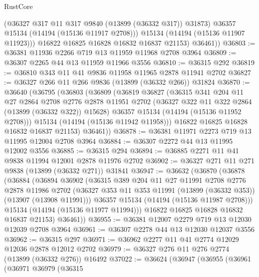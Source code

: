 \begin{lexlean}{RustCore}
\begin{coremodule}
              (@36327 @317 @11 @317 @9840 (@13899 (@36332 @317)) @31873)
              @36357
              @15134
              (@14194 (@15136 @11917 @2708)))
            @15134
            (@14194 (@15136 @11907 @11923)))
          @16822
          @16825
          @16828
          @16832
          @16837
          @21153)
        @36461))
@36803 := @36381 @11936 @2266 @719 @13 @11959 @11968 @2708 @3964
@36809 := @36307 @2265 @44 @13 @11959 @11966 @3556
@36810 := @36315 @292
@36819 := @36810 @343 @11 @41 @9836 @11958 @11965 @2878 @11941 @2702
@36827 := @36327 @266 @11 @266 @9836 (@13899 (@36332 @266)) @31824
@36870 := @36640
    (@36795
      (@36803
        (@36809
          (@36819
            @36827
            (@36315
              @341
              @204
              @11
              @27
              @2864
              @2708
              @2776
              @2878
              @11951
              @2702
              (@36327 @322 @11 @322 @2864 (@13899 (@36332 @322)) @15628)
              @36357
              @15134
              (@14194 (@15136 @11952 @2708)))
            @15134
            (@14194 (@15136 @11942 @11958)))
          @16822
          @16825
          @16828
          @16832
          @16837
          @21153)
        @36461))
@36878 := @36381 @11971 @2273 @719 @13 @11995 @12004 @2708 @3964
@36884 := @36307 @2272 @44 @13 @11995 @12002 @3556
@36885 := @36315 @294
@36894 := @36885 @2271 @11 @41 @9838 @11994 @12001 @2878 @11976 @2702
@36902 := @36327 @271 @11 @271 @9838 (@13899 (@36332 @271)) @31841
@36947 := @36632
    (@36870
      (@36878
        (@36884
          (@36894
            @36902
            (@36315
              @389
              @204
              @11
              @27
              @11991
              @2708
              @2776
              @2878
              @11986
              @2702
              (@36327 @353 @11 @353 @11991 (@13899 (@36332 @353)) (@13907 (@13908 @11991)))
              @36357
              @15134
              (@14194 (@15136 @11987 @2708)))
            @15134
            (@14194 (@15136 @11977 @11994)))
          @16822
          @16825
          @16828
          @16832
          @16837
          @21153)
        @36461))
@36955 := @36381 @12007 @2279 @719 @13 @12030 @12039 @2708 @3964
@36961 := @36307 @2278 @44 @13 @12030 @12037 @3556
@36962 := @36315 @297
@36971 := @36962 @2277 @11 @41 @2774 @12029 @12036 @2878 @12012 @2702
@36979 := @36327 @276 @11 @276 @2774 (@13899 (@36332 @276)) @16492
@37022 := @36624
    (@36947
      (@36955
        (@36961
          (@36971
            @36979
            (@36315

\end{coremodule}
\end{lexlean}
